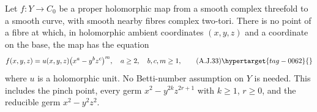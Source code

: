 \begin{proposition}\hypertarget{tag-01B5}{}\label{cdp:st:A.5.15}

Let $f:Y\to C_0$ be a proper holomorphic map from a
smooth complex threefold to a smooth curve, with smooth
nearby fibres complex two-tori. There is no point of
a fibre at which, in holomorphic ambient coordinates
$(x,y,z)$ and a coordinate on the base, the map has
the equation
\[
 f(x,y,z)=u(x,y,z)\bigl(x^a-y^bz^c\bigr)^m,
 \quad a\ge2,\quad b,c,m\ge1,                                    \tag{A.J.33}\hypertarget{tag-0062}{}\label{cdp:eq:A.J.33}
\]
where $u$ is a holomorphic unit. No Betti-number
assumption on $Y$ is needed. This includes the pinch
point, every germ $x^2-y^{2k}z^{2r+1}$ with
$k\ge1$, $r\ge0$, and the reducible germ
$x^2-y^2z^2$.
\end{proposition}
